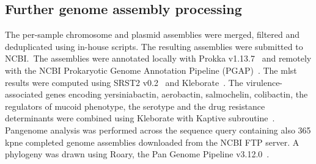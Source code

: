 \subsection{Further genome assembly processing}\label{subsec:proc_ass}
The per-sample chromosome and plasmid assemblies were merged, filtered and deduplicated using in-house scripts.
The resulting assemblies were submitted to NCBI.\
The assemblies were annotated locally with Prokka v1.13.7~\cite{Prokka}
and remotely with the NCBI Prokaryotic Genome Annotation Pipeline (PGAP)~\cite{PGAP}.
The \gls{mlst} results were computed using SRST2 v0.2~\cite{SRST2}
and Kleborate~\cite{Kleborate}.
The virulence-associated genes encoding yersiniabactin, aerobactin, salmochelin, colibactin, the regulators of mucoid
phenotype, the serotype and the drug resistance determinants were combined using Kleborate with
Kaptive subroutine~\cite{Kaptive}.
Pangenome analysis was performed across the sequence query containing also 365 \gls{kpne} completed genome assemblies
downloaded from the NCBI FTP server.
A phylogeny was drawn using Roary, the Pan Genome Pipeline v3.12.0~\cite{Roary}.
